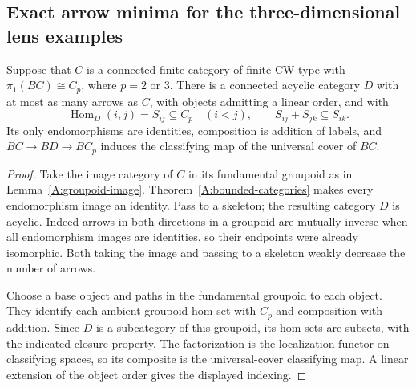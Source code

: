 \subsection{Exact arrow minima for the three-dimensional lens examples}

\begin{lemma}
\label{C:lens-labelled-reduction}
Suppose that $C$ is a connected finite category of finite CW type with
$\pi_1(BC)\cong C_p$, where $p=2$ or $3$. There is a connected acyclic
category $D$ with at most as many arrows as $C$, with objects admitting
a linear order, and with
\[
 \operatorname{Hom}_D(i,j)=S_{ij}\subseteq C_p\quad(i<j),
 \qquad S_{ij}+S_{jk}\subseteq S_{ik}.
\]
Its only endomorphisms are identities, composition is addition of
labels, and $BC\to BD\to BC_p$ induces the classifying map of the
universal cover of $BC$.
\end{lemma}
\begin{proof}
Take the image category of $C$ in its fundamental groupoid as in
Lemma~\ref{A:groupoid-image}. Theorem~\ref{A:bounded-categories} makes
every endomorphism image an identity. Pass to a skeleton; the resulting
category $D$ is acyclic. Indeed arrows in both directions in a groupoid
are mutually inverse when all endomorphism images are identities, so
their endpoints were already isomorphic. Both taking the image and
passing to a skeleton weakly decrease the number of arrows.

Choose a base object and paths in the fundamental groupoid to each
object. They identify each ambient groupoid hom set with $C_p$ and
composition with addition. Since $D$ is a subcategory of this groupoid,
its hom sets are subsets, with the indicated closure property. The
factorization is the localization functor on classifying spaces, so
its composite is the universal-cover classifying map. A linear
extension of the object order gives the displayed indexing.
\end{proof}



